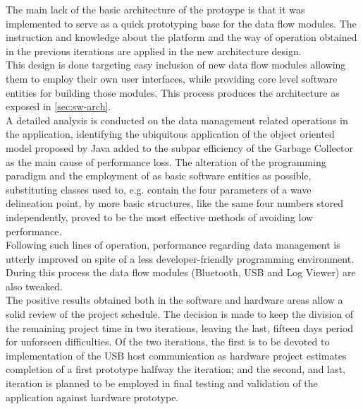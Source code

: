 			The main lack of the basic architecture of the protoype is that it was implemented to serve as a quick prototyping base for the data flow modules. The instruction and knowledge about the platform and the way of operation obtained in the previous iterations are applied in the new architecture design.\\

			This design is done targeting easy inclusion of new data flow modules allowing them to employ their own user interfaces, while providing core level software entities for building those modules. This process produces the architecture as exposed in \autoref{sec:sw-arch}.\\

			A detailed analysis is conducted on the data management related operations in the application, identifying the ubiquitous application of the object oriented model proposed by Java added to the subpar efficiency of the Garbage Collector  as the main cause of performance loss. The alteration of the programming paradigm and the employment of as basic software entities as possible, substituting classes used to, e.g. contain the four parameters of a wave delineation point, by more basic structures, like the same four numbers stored independently, proved to be the most effective methods of avoiding low performance.\\

			Following such lines of operation, performance regarding data management is utterly improved on spite of a less developer-friendly programming environment. During this process the data flow modules (Bluetooth, USB and Log Viewer) are also tweaked.\\

			The positive results obtained both in the software and hardware areas allow a solid review of the project schedule. The decision is made to keep the division of the remaining project time in two iterations, leaving the last, fifteen days period for unforseen difficulties. Of the two iterations, the first is to be devoted to implementation of the USB host communication as hardware project estimates completion of a first prototype halfway the iteration; and the second, and last, iteration is planned to be employed in final testing and validation of the application against hardware prototype.\\

